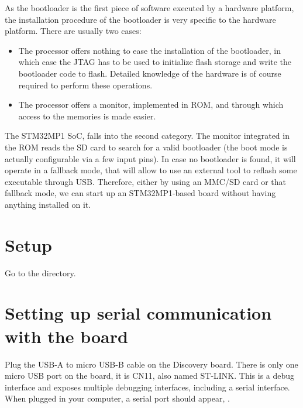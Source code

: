 
As the bootloader is the first piece of software executed by a
hardware platform, the installation procedure of the bootloader is
very specific to the hardware platform. There are usually two cases:

\begin{itemize}

\item The processor offers nothing to ease the installation of the
  bootloader, in which case the JTAG has to be used to initialize
  flash storage and write the bootloader code to flash. Detailed
  knowledge of the hardware is of course required to perform these
  operations.

\item The processor offers a monitor, implemented in ROM, and through
  which access to the memories is made easier.

\end{itemize}

The STM32MP1 SoC, falls into the second category. The monitor
integrated in the ROM reads the SD card to search for a valid
bootloader (the boot mode is actually configurable via a few input
pins). In case no bootloader is found, it will operate in a fallback
mode, that will allow to use an external tool to reflash some
executable through USB. Therefore, either by using an MMC/SD card or
that fallback mode, we can start up an STM32MP1-based board without
having anything installed on it.
\section{Setup}

Go to the  directory.

\section{Setting up serial communication with the board}

Plug the USB-A to micro USB-B cable on the Discovery board. There is
only one micro USB port on the board, it is CN11, also named ST-LINK.
This is a debug interface and exposes multiple debugging interfaces,
including a serial interface. When plugged in your computer, a serial
port should appear, .


